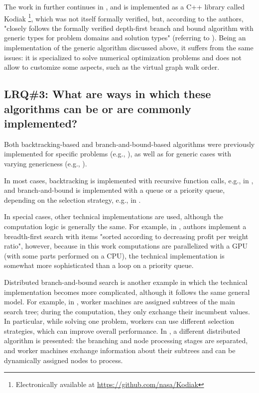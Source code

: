 The work in \cite{narkawicz2013formalnasa} further continues in \cite{smith2015rigorous},
and is implemented as a C++ library called
Kodiak \footnote{Electronically available at \url{https://github.com/nasa/Kodiak}},
which was not itself formally verified, but, according to the authors, "closely follows
the formally verified depth-first branch and bound algorithm with generic types for problem domains
and solution types" (referring to \cite{narkawicz2013formalnasa}). Being an implementation of the
generic algorithm discussed above, it suffers from the same issues: it is specialized to solve
numerical optimization problems and does not allow to customize some aspects, such as the
virtual graph walk order.

\subsection{LRQ\#3: What are ways in which these algorithms can be or are commonly implemented?}

Both backtracking-based and branch-and-bound-based algorithms were previously implemented
for specific problems
(e.g., \cite{bard1990bilevel, breuel2003geometric, lalami2012gpu}),
as well as for generic cases with varying genericness
(e.g., \cite{narkawicz2013formalnasa, voloshinov2017implementation,
finkel1987distrib, prenner1972proglangs, johnson1988modular}).

In most cases, backtracking is implemented with recursive function calls,
e.g., in \cite{narkawicz2013formalnasa, bard1990bilevel},
and branch-and-bound is implemented with a queue or a priority queue,
depending on the selection strategy, e.g., in \cite{breuel2003geometric}.

In special cases, other technical implementations are used, although the computation logic
is generally the same. For example, in \cite{lalami2012gpu}, authors implement a
breadth-first search with items "sorted according to decreasing profit per weight ratio",
however, because in this work computations are parallelized with a GPU
(with some parts performed on a CPU), the technical implementation is somewhat more
sophisticated than a loop on a priority queue.

Distributed branch-and-bound search is another example in which the technical implementation
becomes more complicated, although it follows the same general model. For example,
in \cite{voloshinov2017implementation}, worker machines are assigned subtrees of the main search tree;
during the computation, they only exchange their incumbent values. In particular, while solving one
problem, workers can use different selection strategies, which can improve overall performance.
In \cite{finkel1987distrib}, a different distributed algorithm is presented: the branching and
node processing stages are separated, and worker machines exchange information about their
subtrees and can be dynamically assigned nodes to process.

